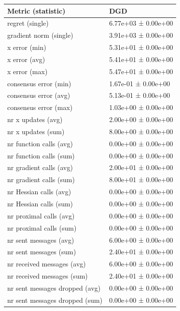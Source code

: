 \begin{tabular}{ll}
\hline
 Metric (statistic)             & DGD                 \\
\hline
 regret (single)                & 6.77e+03 ± 0.00e+00 \\
 gradient norm (single)         & 3.91e+03 ± 0.00e+00 \\
 x error (min)                  & 5.31e+01 ± 0.00e+00 \\
 x error (avg)                  & 5.41e+01 ± 0.00e+00 \\
 x error (max)                  & 5.47e+01 ± 0.00e+00 \\
 consensus error (min)          & 1.67e-01 ± 0.00e+00 \\
 consensus error (avg)          & 5.13e-01 ± 0.00e+00 \\
 consensus error (max)          & 1.03e+00 ± 0.00e+00 \\
 nr x updates (avg)             & 2.00e+00 ± 0.00e+00 \\
 nr x updates (sum)             & 8.00e+00 ± 0.00e+00 \\
 nr function calls (avg)        & 0.00e+00 ± 0.00e+00 \\
 nr function calls (sum)        & 0.00e+00 ± 0.00e+00 \\
 nr gradient calls (avg)        & 2.00e+01 ± 0.00e+00 \\
 nr gradient calls (sum)        & 8.00e+01 ± 0.00e+00 \\
 nr Hessian calls (avg)         & 0.00e+00 ± 0.00e+00 \\
 nr Hessian calls (sum)         & 0.00e+00 ± 0.00e+00 \\
 nr proximal calls (avg)        & 0.00e+00 ± 0.00e+00 \\
 nr proximal calls (sum)        & 0.00e+00 ± 0.00e+00 \\
 nr sent messages (avg)         & 6.00e+00 ± 0.00e+00 \\
 nr sent messages (sum)         & 2.40e+01 ± 0.00e+00 \\
 nr received messages (avg)     & 6.00e+00 ± 0.00e+00 \\
 nr received messages (sum)     & 2.40e+01 ± 0.00e+00 \\
 nr sent messages dropped (avg) & 0.00e+00 ± 0.00e+00 \\
 nr sent messages dropped (sum) & 0.00e+00 ± 0.00e+00 \\
\hline
\end{tabular}